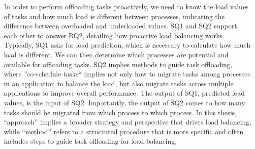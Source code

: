 In order to perform offloading tasks proactively, we need to know the load values of tasks and how much load is different between processes, indicating the difference between overloaded and underloaded values. SQ1 and SQ2 support each other to answer RQ2, detailing how proactive load balancing works. Typically, SQ1 asks for load prediction, which is necessary to calculate how much load is different. We can then determine which processes are potential and available for offloading tasks. SQ2 implies methods to guide task offloading, where ''co-schedule tasks`` implies not only how to migrate tasks among processes in an application to balance the load, but also migrate tasks across multiple applications to improve overall performance. The output of SQ1, predicted load values, is the input of SQ2. Importantly, the output of SQ2 comes to how many tasks should be migrated from which process to which process. In this thesis, ``approach'' implies a broader strategy and perspective that drives load balancing, while ``method'' refers to a structured procedure that is more specific and often includes steps to guide task offloading for load balancing.




